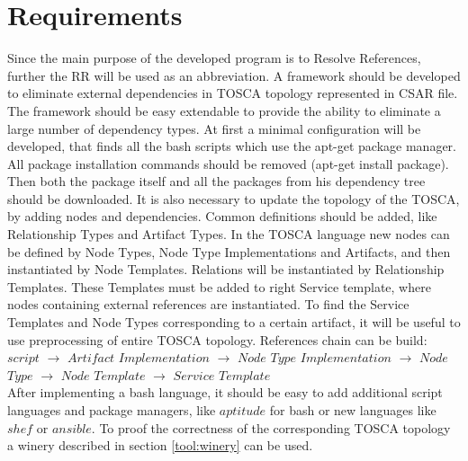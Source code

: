 
\chapter{Requirements}
\label{chap:req}
Since the main purpose of the developed program is to Resolve References, further the RR will be used as an abbreviation. 
A framework should be developed to eliminate external dependencies in TOSCA topology represented in CSAR file.
The framework should be easy extendable to provide the ability to eliminate a large number of dependency types.
At first a minimal configuration will be developed, that finds all the bash scripts which use the apt-get package manager. 
All package installation commands should be removed (apt-get install package).
Then both the package itself and all the packages from his dependency tree should be downloaded.
It is also necessary to update the topology of the TOSCA, by adding nodes and dependencies.
Common definitions should be added, like Relationship Types and Artifact Types.
In the TOSCA language new nodes can be defined by Node Types, Node Type Implementations and Artifacts, and then instantiated by Node Templates. 
Relations will be instantiated by  Relationship Templates.
These Templates must be added to right Service template, where nodes containing external references are instantiated.
To find the Service Templates and Node Types corresponding to a certain artifact, it will be useful to use preprocessing of entire TOSCA topology. 
References chain can be build:\\
$script$ $\rightarrow$ $Artifact$ $Implementation$ $\rightarrow$ $Node$ $Type$ $Implementation$ $\rightarrow$ $Node$ $Type$ $\rightarrow$ $Node$ $Template$ $\rightarrow$ $Service$ $Template$\\
After implementing a bash language, it should be easy to add additional script languages and package managers, like $aptitude$ for bash or new languages like $shef$ or $ansible$.
To proof the correctness of the corresponding TOSCA topology a winery described in section \ref{tool:winery} can be used.
